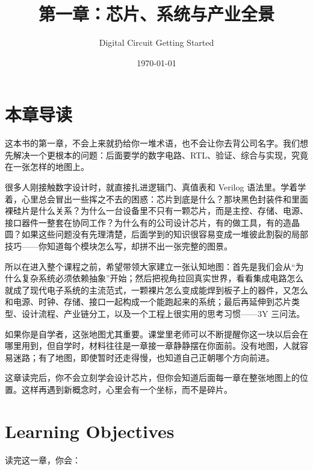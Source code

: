 \documentclass[11pt,a4paper]{article}
\title{第一章：芯片、系统与产业全景}
\author{Digital Circuit Getting Started}
\date{\today}
\begin{document}
\maketitle

\section{本章导读}

这本书的第一章，不会上来就扔给你一堆术语，也不会让你去背公司名字。我们想先解决一个更根本的问题：后面要学的数字电路、RTL、验证、综合与实现，究竟在一张怎样的地图上。

很多人刚接触数字设计时，就直接扎进逻辑门、真值表和 Verilog 语法里。学着学着，心里总会冒出一些挥之不去的困惑：芯片到底是什么？那块黑色封装件和里面裸硅片是什么关系？为什么一台设备里不只有一颗芯片，而是主控、存储、电源、接口器件一整套在协同工作？为什么有的公司设计芯片，有的做工具，有的造晶圆？如果这些问题没有先理清楚，后面学到的知识很容易变成一堆彼此割裂的局部技巧——你知道每个模块怎么写，却拼不出一张完整的图景。

所以在进入整个课程之前，希望带领大家建立一张认知地图：首先是我们会从``为什么复杂系统必须依赖抽象''开始；然后把视角拉回真实世界，看看集成电路怎么就成了现代电子系统的主流范式，一颗裸片怎么变成能焊到板子上的器件，又怎么和电源、时钟、存储、接口一起构成一个能跑起来的系统；最后再延伸到芯片类型、设计流程、产业链分工，以及一个工程上很实用的思考习惯——3Y 三问法。

如果你是自学者，这张地图尤其重要。课堂里老师可以不断提醒你这一块以后会在哪里用到，但自学时，材料往往是一章接一章静静摆在你面前。没有地图，人就容易迷路；有了地图，即使暂时还走得慢，也知道自己正朝哪个方向前进。

这章读完后，你不会立刻学会设计芯片，但你会知道后面每一章在整张地图上的位置。这样再遇到新概念时，心里会有一个坐标，而不是碎片。

\section{Learning Objectives}

读完这一章，你会：
\end{document}
